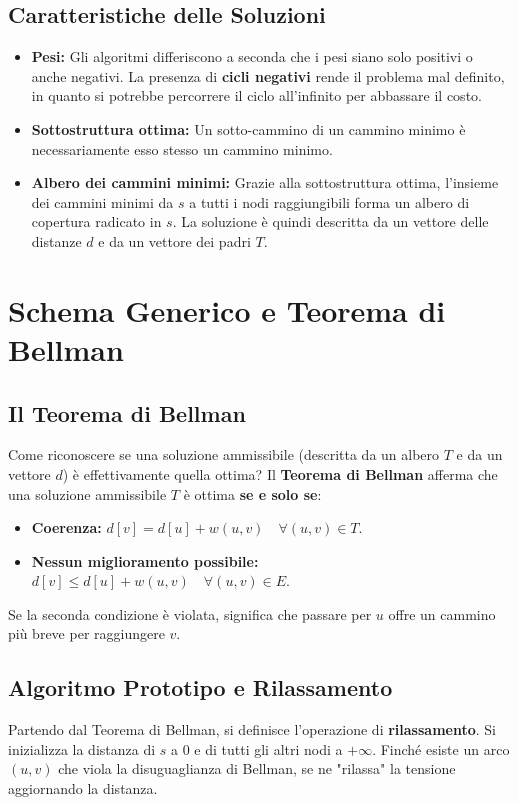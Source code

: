 \documentclass[12pt, a4paper]{article}
\begin{document}
\subsection{Caratteristiche delle Soluzioni}
\begin{itemize}
\item \textbf{Pesi:} Gli algoritmi differiscono a seconda che i pesi siano solo positivi o anche negativi. La presenza di \textbf{cicli negativi} rende il problema mal definito, in quanto si potrebbe percorrere il ciclo all'infinito per abbassare il costo.
\item \textbf{Sottostruttura ottima:} Un sotto-cammino di un cammino minimo è necessariamente esso stesso un cammino minimo.
\item \textbf{Albero dei cammini minimi:} Grazie alla sottostruttura ottima, l'insieme dei cammini minimi da $s$ a tutti i nodi raggiungibili forma un albero di copertura radicato in $s$. La soluzione è quindi descritta da un vettore delle distanze $d$ e da un vettore dei padri $T$.
\end{itemize}

\newpage

\section{Schema Generico e Teorema di Bellman}

\subsection{Il Teorema di Bellman}
Come riconoscere se una soluzione ammissibile (descritta da un albero $T$ e da un vettore $d$) è effettivamente quella ottima? Il \textbf{Teorema di Bellman} afferma che una soluzione ammissibile $T$ è ottima \textbf{se e solo se}:
\begin{itemize}
\item \textbf{Coerenza:} $d[v] = d[u] + w(u,v) \quad \forall (u,v) \in T$.
\item \textbf{Nessun miglioramento possibile:} $d[v] \le d[u] + w(u,v) \quad \forall (u,v) \in E$.
\end{itemize}
Se la seconda condizione è violata, significa che passare per $u$ offre un cammino più breve per raggiungere $v$.

\subsection{Algoritmo Prototipo e Rilassamento}
Partendo dal Teorema di Bellman, si definisce l'operazione di \textbf{rilassamento}. Si inizializza la distanza di $s$ a 0 e di tutti gli altri nodi a $+\infty$. Finché esiste un arco $(u,v)$ che viola la disuguaglianza di Bellman, se ne "rilassa" la tensione aggiornando la distanza.
\end{document}
